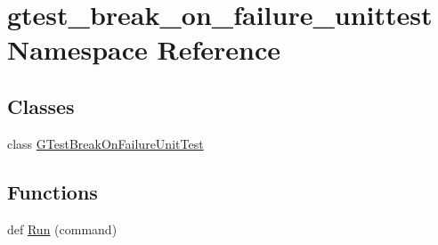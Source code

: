 \hypertarget{namespacegtest__break__on__failure__unittest}{}\section{gtest\+\_\+break\+\_\+on\+\_\+failure\+\_\+unittest Namespace Reference}
\label{namespacegtest__break__on__failure__unittest}
\subsection*{Classes}
\begin{DoxyCompactItemize}
\item 
class \hyperlink{classgtest__break__on__failure__unittest_1_1GTestBreakOnFailureUnitTest}{G\+Test\+Break\+On\+Failure\+Unit\+Test}
\end{DoxyCompactItemize}
\subsection*{Functions}
\begin{DoxyCompactItemize}
\item 
def \hyperlink{namespacegtest__break__on__failure__unittest_a0dd80fec2d9cbd9b6fa70130f7b228ec}{Run} (command)
\end{DoxyCompactItemize}
